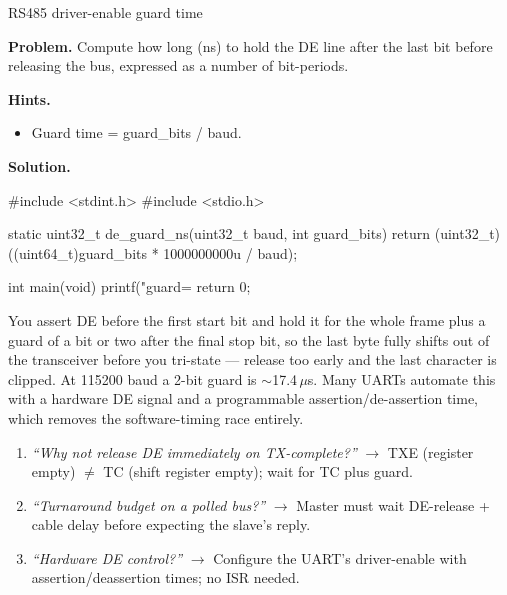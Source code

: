 \begin{gymproblem}{RS485 driver-enable guard time}

\textbf{Problem.} Compute how long (ns) to hold the DE line after the last bit
before releasing the bus, expressed as a number of bit-periods.

\textbf{Hints.}
\begin{itemize}
\item Guard time = guard\_bits / baud.
\end{itemize}

\attempt

\textbf{Solution.}
\begin{cgym}
#include <stdint.h>
#include <stdio.h>

static uint32_t de_guard_ns(uint32_t baud, int guard_bits) {
    return (uint32_t)((uint64_t)guard_bits * 1000000000u / baud);
}

int main(void) {
    printf("guard=%
    return 0;
}
\end{cgym}

You assert DE before the first start bit and hold it for the whole frame plus a
guard of a bit or two after the final stop bit, so the last byte fully shifts
out of the transceiver before you tri-state --- release too early and the last
character is clipped. At 115200 baud a 2-bit guard is $\sim$17.4\,$\mu$s. Many
UARTs automate this with a hardware DE signal and a programmable
assertion/de-assertion time, which removes the software-timing race entirely.

\followups
\begin{enumerate}
\item \emph{``Why not release DE immediately on TX-complete?''} $\rightarrow$
  TXE (register empty) $\neq$ TC (shift register empty); wait for TC plus guard.
\item \emph{``Turnaround budget on a polled bus?''} $\rightarrow$ Master must
  wait DE-release + cable delay before expecting the slave's reply.
\item \emph{``Hardware DE control?''} $\rightarrow$ Configure the UART's
  driver-enable with assertion/deassertion times; no ISR needed.
\end{enumerate}
\end{gymproblem}

